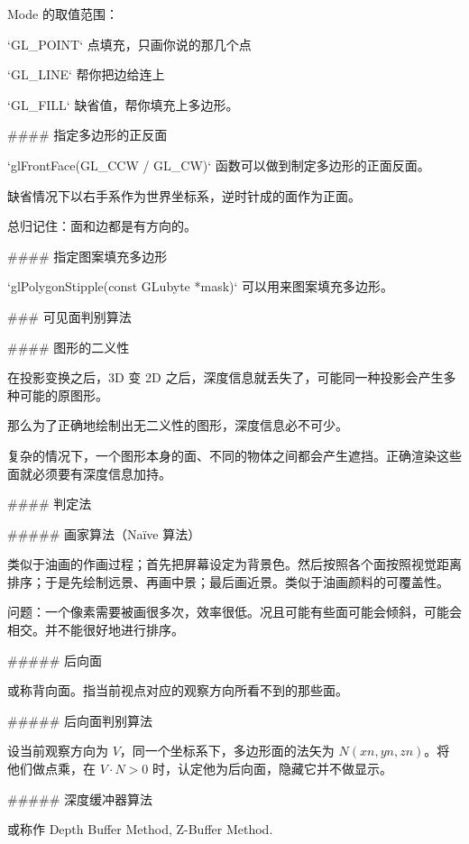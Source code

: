 \documentclass[
]{article}
\newenvironment{Shaded}{}{}
\newcommand{\BaseNTok}[1]{\textcolor[rgb]{0.25,0.63,0.44}{#1}}
\newcommand{\FunctionTok}[1]{\textcolor[rgb]{0.02,0.16,0.49}{#1}}
\newcommand{\NormalTok}[1]{#1}
\begin{document}
\begin{Shaded}
\begin{Highlighting}[]
\NormalTok{Mode 的取值范围：}

\BaseNTok{`GL_POINT`}\NormalTok{ 点填充，只画你说的那几个点}

\BaseNTok{`GL_LINE`}\NormalTok{ 帮你把边给连上}

\BaseNTok{`GL_FILL`}\NormalTok{ 缺省值，帮你填充上多边形。}

\FunctionTok{#### 指定多边形的正反面}

\BaseNTok{`glFrontFace(GL_CCW / GL_CW)`}\NormalTok{ 函数可以做到制定多边形的正面反面。}

\NormalTok{缺省情况下以右手系作为世界坐标系，逆时针成的面作为正面。}

\NormalTok{总归记住：面和边都是有方向的。}

\FunctionTok{#### 指定图案填充多边形}

\BaseNTok{`glPolygonStipple(const GLubyte *mask)`}\NormalTok{ 可以用来图案填充多边形。 }

\FunctionTok{### 可见面判别算法}

\FunctionTok{#### 图形的二义性}

\NormalTok{在投影变换之后，3D 变 2D 之后，深度信息就丢失了，可能同一种投影会产生多种可能的原图形。}

\NormalTok{那么为了正确地绘制出无二义性的图形，深度信息必不可少。}

\NormalTok{复杂的情况下，一个图形本身的面、不同的物体之间都会产生遮挡。正确渲染这些面就必须要有深度信息加持。}

\FunctionTok{#### 判定法}

\FunctionTok{##### 画家算法（Naïve 算法）}

\NormalTok{类似于油画的作画过程；首先把屏幕设定为背景色。然后按照各个面按照视觉距离排序；于是先绘制远景、再画中景；最后画近景。类似于油画颜料的可覆盖性。}

\NormalTok{问题：一个像素需要被画很多次，效率很低。况且可能有些面可能会倾斜，可能会相交。并不能很好地进行排序。}

\FunctionTok{##### 后向面}

\NormalTok{或称背向面。指当前视点对应的观察方向所看不到的那些面。}

\FunctionTok{##### 后向面判别算法}

\NormalTok{设当前观察方向为 $V$，同一个坐标系下，多边形面的法矢为 $N(xn, yn, zn)$。将他们做点乘，在 $V·N>0$ 时，认定他为后向面，隐藏它并不做显示。}

\FunctionTok{##### 深度缓冲器算法}

\NormalTok{或称作 Depth Buffer Method, Z-Buffer Method.}


\end{Highlighting}
\end{Shaded}
\end{document}
